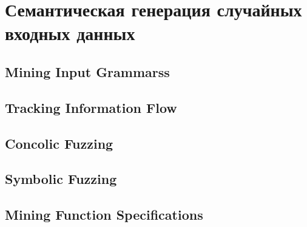 \section{Семантическая генерация случайных входных данных} \label{section_4}

\subsection{Mining Input Grammarss}


\subsection{Tracking Information Flow}


\subsection{Concolic Fuzzing}


\subsection{Symbolic Fuzzing}


\subsection{Mining Function Specifications}

